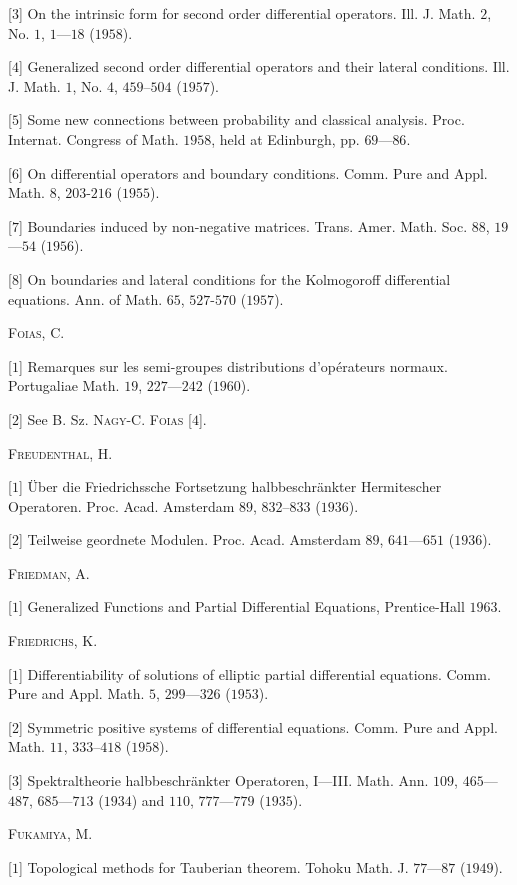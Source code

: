 [$3$] On the intrinsic form for second order differential operators. Ill. J. Math. $2$, No. $1$, $1$---$18$ ($1958$). 

[$4$] Generalized second order differential operators and their lateral conditions. Ill. J. Math. $1$, No. $4$, $459$--$504$ ($1957$). 

[$5$] Some new connections between probability and classical analysis. Proc. Internat. Congress of Math. $1958$, held at Edinburgh, pp. $69$---$86$. 

[$6$] On differential operators and boundary conditions. Comm. Pure and Appl. Math. $8$, $203$-$216$ ($1955$). 

[$7$] Boundaries induced by non-negative matrices. Trans. Amer. Math. Soc. $88$, $19$---$54$ ($1956$). 

[$8$] On boundaries and lateral conditions for the Kolmogoroff differential equations. Ann. of Math. $65$, $527$-$570$ ($1957$). 

\textsc{Foias}, C. 

[$1$] Remarques sur les semi-groupes distributions d'opérateurs normaux. Portugaliae Math. $19$, $227$---$242$ ($1960$). 

[$2$] See B. Sz. \textsc{Nagy}-C. \textsc{Foias} [$4$]. 

\textsc{Freudenthal}, H. 

[$1$] Über die Friedrichssche Fortsetzung halbbeschränkter Hermitescher Operatoren. Proc. Acad. Amsterdam $89$, $832$--$833$ ($1936$). 

[$2$] Teilweise geordnete Modulen. Proc. Acad. Amsterdam $89$, $641$---$651$ ($1936$). 

\textsc{Friedman}, A. 

[$1$] Generalized Functions and Partial Differential Equations, Prentice-Hall $1963$. 

\textsc{Friedrichs}, K. 

[$1$] Differentiability of solutions of elliptic partial differential equations. Comm. Pure and Appl. Math. $5$, $299$---$326$ ($1953$). 

[$2$] Symmetric positive systems of differential equations. Comm. Pure and Appl. Math. $11$, $333$--$418$ ($1958$). 

[$3$] Spektraltheorie halbbeschränkter Operatoren, I---III. Math. Ann. $109$, $465$---$487$, $685$---$713$ ($1934$) and $110$, $777$---$779$ ($1935$). 

\textsc{Fukamiya}, M. 

[$1$] Topological methods for Tauberian theorem. Tohoku Math. J. $77$---$87$ ($1949$). 

